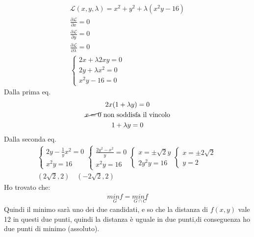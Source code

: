 \documentclass[a4paper, oneside]{article}
\begin{document}
        \begin{example}
            \begin{gather*}
                \mathcal{L} (x,y,\lambda) = x^2+y^2+\lambda(x^2y-16)\\
                \frac{\partial \mathcal{L}}{\partial x} = 0\\
                \frac{\partial \mathcal{L}}{\partial y} = 0\\
                \frac{\partial \mathcal{L}}{\partial \lambda} = 0\\
                \begin{cases}
                    2x + \lambda 2xy = 0\\
                    2y +\lambda x^2 = 0\\
                    x^2 y -16 = 0
                \end{cases}
            \end{gather*}
            Dalla prima eq.
            \begin{gather*}
                2x(1+\lambda y) = 0\\
                \cancel{x = 0} \text{ non soddisfa il vincolo}\\
                1 + \lambda y = 0
            \end{gather*}
            Dalla seconda eq.
            \begin{gather*}
                \begin{cases}
                    2y -\frac{1}{y} x^2 = 0\\
                    x^2y = 16
                \end{cases}
                \begin{cases}
                    \frac{2y^2-x^2}{y} = 0\\
                    x^2y = 16
                \end{cases}
                \begin{cases}
                    x = \pm \sqrt{2}y\\
                    2y^2y = 16
                \end{cases}
                \begin{cases}
                    x = \pm 2\sqrt{2}\\
                    y = 2
                \end{cases}\\
            (2\sqrt{2},2) \quad (-2\sqrt{2},2)    
            \end{gather*}
            Ho trovato che:
            \begin{gather*}
                \underset{G}{min f} = \underset{G \cap C}{min f}
            \end{gather*}
            Quindi il minimo sarà uno dei due candidati, e so che la distanza di $f(x,y)$ vale 12 in questi due punti, quindi la distanza è uguale in due punti,di conseguenza ho due punti di minimo (assoluto).
        \end{example}
\end{document}
